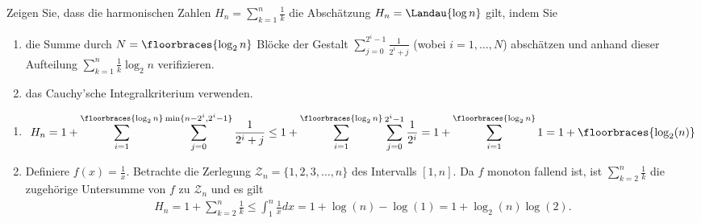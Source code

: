 
\begin{exercise}

Zeigen Sie, dass die harmonischen Zahlen $H_n = \sum_{k=1}^n \frac{1}{k}$ die Abschätzung $H_n = \Landau{\log{n}}$ gilt, indem Sie

\begin{enumerate}
    \item die Summe durch $N = \floorbraces{\log_2{n}}$ Blöcke der Gestalt $\sum_{j=0}^{2^i - 1} \frac{1}{2^i + j}$ (wobei $i= 1, \ldots, N$) abschätzen und anhand dieser Aufteilung $\sum_{k=1}^n \frac{1}{k} \log_2{n}$ verifizieren.
    \item das Cauchy’sche Integralkriterium verwenden.
\end{enumerate}

\end{exercise}


\begin{solution}
\begin{enumerate}
\item
\begin{align*}
  H_n = 1 + \sum_{i=1}^{\floorbraces{\log_2{n}}}\sum_{j=0}^{\min\{n - 2^i,2^i - 1\}} \frac{1}{2^i + j}
  \leq 1 + \sum_{i=1}^{\floorbraces{\log_2{n}}}\sum_{j=0}^{2^i - 1} \frac{1}{2^i}
  = 1 + \sum_{i=1}^{\floorbraces{\log_2{n}}}1 = 1 + \floorbraces{\log_2(n)}
\end{align*}
\item
Definiere $f(x) = \frac{1}{x}$. Betrachte die Zerlegung
$\mathcal{Z}_n = \{1,2,3,\dots,n\}$ des Intervalls $[1,n]$.
Da $f$ monoton fallend ist, ist $\sum_{k=2}^n\frac{1}{k}$
die zugehörige Untersumme von $f$ zu $\mathcal{Z}_n$ und es gilt
\begin{align*}
  H_n =  1 + \sum_{k=2}^n\frac{1}{k} \leq \int_1^n \frac{1}{x} dx
  = 1 + \log(n) - \log(1) = 1 + \log_2(n)\log(2).
\end{align*}
\end{enumerate}
\end{solution}

